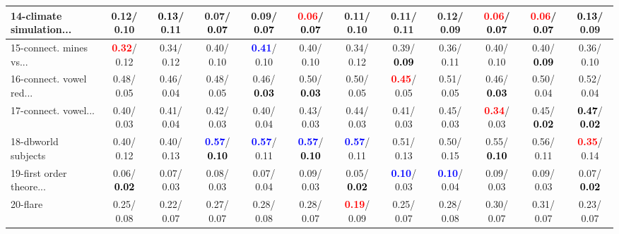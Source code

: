 \begin{table}[h]
\begin{center}
{\begin{tabular}{lc|c|c|c|c|c|c|c|c|c|c}
14-climate simulation... &   0.12/  0.10 & \textcolor{black}{\textbf{  0.13}}/  0.11 &   0.07/\textcolor{black}{\textbf{  0.07}} &   0.09/\textcolor{black}{\textbf{  0.07}} & \textcolor{red}{\textbf{  0.06}}/\textcolor{black}{\textbf{  0.07}} &   0.11/  0.10 &   0.11/  0.11 &   0.12/  0.09 & \textcolor{red}{\textbf{  0.06}}/\textcolor{black}{\textbf{  0.07}} & \textcolor{red}{\textbf{  0.06}}/\textcolor{black}{\textbf{  0.07}} & \textcolor{black}{\textbf{  0.13}}/  0.09 \\ \hline
15-connect. mines vs... & \textcolor{red}{\textbf{  0.32}}/  0.12 &   0.34/  0.12 &   0.40/  0.10 & \textcolor{blue}{\textbf{  0.41}}/  0.10 &   0.40/  0.10 &   0.34/  0.12 &   0.39/\textcolor{black}{\textbf{  0.09}} &   0.36/  0.11 &   0.40/  0.10 &   0.40/\textcolor{black}{\textbf{  0.09}} &   0.36/  0.10 \\
16-connect. vowel red... &   0.48/  0.05 &   0.46/  0.04 &   0.48/  0.05 &   0.46/\textcolor{black}{\textbf{  0.03}} &   0.50/\textcolor{black}{\textbf{  0.03}} &   0.50/  0.05 & \textcolor{red}{\textbf{  0.45}}/  0.05 &   0.51/  0.05 &   0.46/\textcolor{black}{\textbf{  0.03}} &   0.50/  0.04 &   0.52/  0.04 \\
17-connect. vowel... &   0.40/  0.03 &   0.41/  0.04 &   0.42/  0.03 &   0.40/  0.04 &   0.43/  0.03 &   0.44/  0.03 &   0.41/  0.03 &   0.45/  0.03 & \textcolor{red}{\textbf{  0.34}}/  0.03 &   0.45/\textcolor{black}{\textbf{  0.02}} & \textcolor{black}{\textbf{  0.47}}/\textcolor{black}{\textbf{  0.02}} \\
18-dbworld subjects &   0.40/  0.12 &   0.40/  0.13 & \textcolor{blue}{\textbf{  0.57}}/\textcolor{black}{\textbf{  0.10}} & \textcolor{blue}{\textbf{  0.57}}/  0.11 & \textcolor{blue}{\textbf{  0.57}}/\textcolor{black}{\textbf{  0.10}} & \textcolor{blue}{\textbf{  0.57}}/  0.11 &   0.51/  0.13 &   0.50/  0.15 &   0.55/\textcolor{black}{\textbf{  0.10}} &   0.56/  0.11 & \textcolor{red}{\textbf{  0.35}}/  0.14 \\
19-first order theore... &   0.06/\textcolor{black}{\textbf{  0.02}} &   0.07/  0.03 &   0.08/  0.03 &   0.07/  0.04 &   0.09/  0.03 &   0.05/\textcolor{black}{\textbf{  0.02}} & \textcolor{blue}{\textbf{  0.10}}/  0.03 & \textcolor{blue}{\textbf{  0.10}}/  0.04 &   0.09/  0.03 &   0.09/  0.03 &   0.07/\textcolor{black}{\textbf{  0.02}} \\
20-flare &   0.25/  0.08 &   0.22/  0.07 &   0.27/  0.07 &   0.28/  0.08 &   0.28/  0.07 & \textcolor{red}{\textbf{  0.19}}/  0.09 &   0.25/  0.07 &   0.28/  0.08 &   0.30/  0.07 &   0.31/  0.07 &   0.23/  0.07 \\

\end{tabular}}
\end{center}
\end{table}
